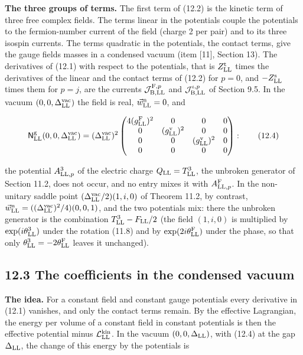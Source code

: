 \documentclass[
  10pt,
]{article}
\begin{document}
\textbf{The three groups of terms.} The first term of (12.2) is the
kinetic term of three free complex fields. The terms linear in the
potentials couple the potentials to the fermion-number current of the
field (charge 2 per pair) and to its three isospin currents. The terms
quadratic in the potentials, the contact terms, give the gauge fields
masses in a condensed vacuum (item {[}11{]}, Section 13). The
derivatives of (12.1) with respect to the potentials, that is
\(Z^{\rm t}_{\rm LL}\) times the derivatives of the linear and the
contact terms of (12.2) for \(p=0\), and \(-Z^{\rm s}_{\rm LL}\) times
them for \(p=j\), are the currents
\(\mathcal J^{{\rm F},p}_{{\rm B},{\rm LL}}\) and
\(\mathcal J^{\iota,p}_{{\rm B},{\rm LL}}\) of Section 9.5. In the
vacuum \((0,0,\Delta^{\rm vac}_{\rm LL})\) the field is real,
\(\vec w^{\rm n}_{\rm LL}=0\), and

\[\mathsf N^{\rm g}_{\rm LL}(0,0,\Delta^{\rm vac}_{\rm LL})=(\Delta^{\rm vac}_{\rm LL})^2\begin{pmatrix}4(g^{\rm F}_{\rm LL})^2&0&0&0\\0&(g^{\rm v}_{\rm LL})^2&0&0\\0&0&(g^{\rm v}_{\rm LL})^2&0\\0&0&0&0\end{pmatrix}:\tag{12.4}\]

the potential \(A^3_{{\rm LL},p}\) of the electric charge
\(Q_{\rm LL}=T^3_{\rm LL}\), the unbroken generator of Section 11.2,
does not occur, and no entry mixes it with \(A^{\rm F}_{{\rm LL},p}\).
In the non-unitary saddle point \((\Delta^{\rm vac}_{\rm LL}/2)(1,i,0)\)
of Theorem 11.2, by contrast,
\(\vec w^{\rm n}_{\rm LL}=((\Delta^{\rm vac}_{\rm LL})^2/4)(0,0,1)\),
and the two potentials mix: there the unbroken generator is the
combination \(T^3_{\rm LL}-F_{\rm LL}/2\) (the field \((1,i,0)\) is
multiplied by \(\exp(i\theta^3_{\rm LL})\) under the rotation (11.8) and
by \(\exp(2i\theta^{\rm F}_{\rm LL})\) under the phase, so that only
\(\theta^3_{\rm LL}=-2\theta^{\rm F}_{\rm LL}\) leaves it unchanged).

\hypertarget{the-coefficients-in-the-condensed-vacuum}{%
\subsection{12.3 The coefficients in the condensed
vacuum}\label{the-coefficients-in-the-condensed-vacuum}}

\textbf{The idea.} For a constant field and constant gauge potentials
every derivative in (12.1) vanishes, and only the contact terms remain.
By the effective Lagrangian, the energy per volume of a constant field
in constant potentials is then the effective potential minus
\(\mathcal L^{\rm kin}_{\rm LL}\). In the vacuum
\((0,0,\Delta_{\rm LL})\), with (12.4) at the gap \(\Delta_{\rm LL}\),
the change of this energy by the potentials is
\end{document}
